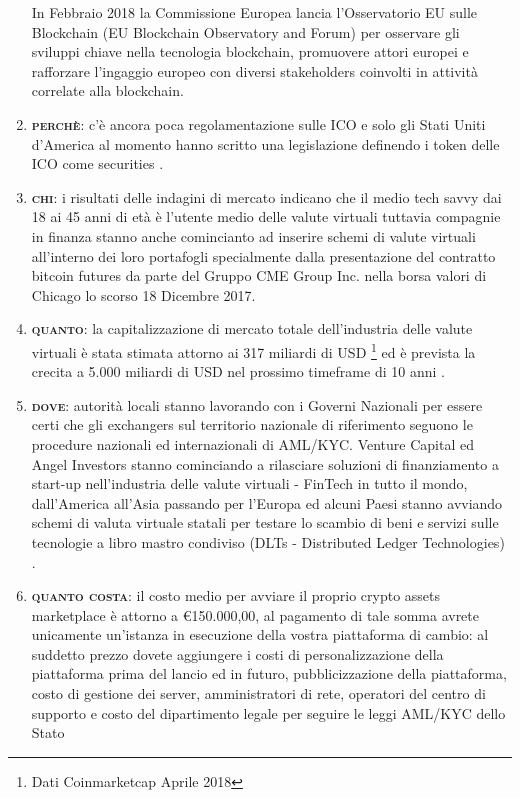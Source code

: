 \documentclass[11pt,fleqn]{book} %
\begin{document}
\begin{enumerate}
	In Febbraio 2018 la Commissione Europea lancia l'Osservatorio EU sulle Blockchain (EU Blockchain Observatory and Forum) \cite{EUBOaF} 
	per osservare gli sviluppi chiave nella tecnologia blockchain, promuovere attori europei e rafforzare l'ingaggio europeo con
	diversi stakeholders coinvolti in attività correlate alla blockchain.
	\item \textbf{\textsc{perchè}}: c'è ancora poca regolamentazione sulle ICO e solo gli Stati Uniti d'America al momento
	hanno scritto una legislazione definendo i token delle ICO come securities \cite{SECICO}.
	\item \textbf{\textsc{chi}}: i risultati delle indagini di mercato indicano che il medio tech savvy dai 18 ai 45 anni di età è
	l'utente medio delle valute virtuali tuttavia compagnie in finanza stanno anche comincianto ad inserire schemi di 
	valute virtuali all'interno dei loro portafogli specialmente dalla presentazione del contratto bitcoin futures 
	da parte del Gruppo CME Group Inc. nella borsa valori di Chicago lo scorso 18 Dicembre 2017.
	\item \textbf{\textsc{quanto}}: la capitalizzazione di mercato totale dell'industria delle valute virtuali è stata stimata attorno
	ai 317 miliardi di USD \footnote{Dati Coinmarketcap Aprile 2018}
	ed è prevista la crecita a 5.000 miliardi di USD nel prossimo timeframe di 10 anni \cite{cryptoMCTenYears}.
	\item \textbf{\textsc{dove}}: autorità locali stanno lavorando con i Governi Nazionali per essere certi che gli exchangers sul 
	territorio nazionale di riferimento seguono le procedure nazionali ed internazionali di AML/KYC.
	Venture Capital ed Angel Investors stanno cominciando a rilasciare soluzioni di finanziamento a start-up nell'industria delle
	valute virtuali - FinTech in tutto il mondo, dall'America all'Asia passando per l'Europa ed alcuni Paesi
	stanno avviando schemi di valuta virtuale statali per testare lo scambio di beni e servizi sulle tecnologie a libro 
	mastro condiviso (DLTs - Distributed Ledger Technologies) \cite{petro}.
	\item \textbf{\textsc{quanto costa}}: il costo medio per avviare il proprio crypto assets marketplace è attorno a \euro 150.000,00, 
	al pagamento di tale somma avrete unicamente un'istanza in esecuzione della vostra piattaforma di cambio: al suddetto prezzo dovete aggiungere i costi
	di personalizzazione della piattaforma prima del lancio ed in futuro, pubblicizzazione della piattaforma, costo di gestione dei server, 
	amministratori di rete, operatori del centro di supporto e costo del dipartimento legale per seguire le leggi AML/KYC dello Stato

\end{enumerate}
\end{document}
